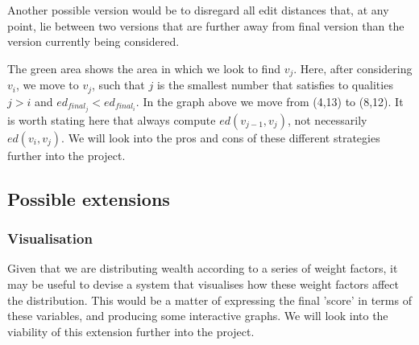 \documentclass[a4paper,11pt,twoside,notitlepage]{article}
\begin{document}
        Another possible version would be to disregard all edit
        distances that, at any point, lie between two versions that
        are further away from final version than the version
        currently being considered.

        \begin{figure}[H]
          \centering
          \pgfplotsset{width=0.5\textwidth}
          \label{fig:dummy_optimisation_2}
        \end{figure}
        
        The green area shows the area in which we look to find
        $v_j$. Here, after considering $v_i$, we move to $v_j$, such
        that $j$ is the smallest number that satisfies to qualities $j
        > i$ and $ed_{final_j} < ed_{final_i}$. In the graph above we
        move from (4,13) to (8,12). It is worth stating here that
        always compute $ed(v_{j-1}, v_j)$, not necessarily
        $ed(v_i,v_j)$. We will look into the pros and cons of these
        different strategies further into the project.

        \subsection*{Possible extensions}
        \subsubsection*{Visualisation}
        Given that we are distributing wealth according to a series of
        weight factors, it may be useful to devise a system that
        visualises how these weight factors affect the
        distribution. This would be a matter of expressing the final
        'score' in terms of these variables, and producing some
        interactive graphs. We will look into the viability of this
        extension further into the project.
        
\end{document}
